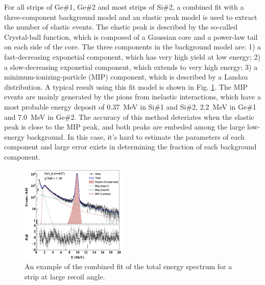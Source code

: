 \documentclass[fleqn,twocolumn,a4paper]{ikpar}
\begin{document}
For all strips of Ge\#1, Ge\#2 and most strips of Si\#2, a combined fit with
a three-component background model and an elastic peak model is used to extract
the number of elastic events.
The elastic peak is described by the so-called Crystal-ball function\cite{r1}, which
is composed of a Gaussian core and a power-law tail on each side of the core.
The three components in the background model are: 1) a
fast-decreasing exponetial component, which has very high yield at low energy; 2)
a slow-decreasing exponetial component, which extends to very high energy; 3) a
minimum-ionizing-particle (MIP) component, which is described by a Landau
distribution.
A typical result using this fit model is shown in Fig. \ref{fig:combined_fit}.
The MIP events are mainly generated by the pions from inelastic interactions,
which have a most probable energy deposit of \SI{0.37}{\MeV} in Si\#1 and Si\#2,
\SI{2.2}{\MeV} in Ge\#1 and \SI{7.0}{\MeV} in Ge\#2.
The accuracy of this method deteriates when the elastic peak is close to the MIP
peak, and both peaks are embeded among the large low-energy background.
In this case, it's hard to estimate the parameters of each component and large
error exists in determining the fraction of each background component.
\begin{figure}[!htb]
	\includegraphics[width=0.45\textwidth]{./combined_fit.png}
  \caption{An example of the combined fit of the total energy spectrum for a strip at large recoil angle.}
  \label{fig:combined_fit}
\end{figure}

\enlargethispage{-\baselineskip}
\par
\medskip
\end{document}
